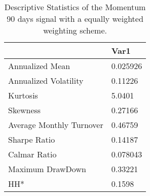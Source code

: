 \begin{table}[H]
\centering
\begin{tabular}{ll}
& Var1 \\ 
\hline 
Annualized Mean & 0.025926 \\ 
Annualized Volatility & 0.11226 \\ 
Kurtosis & 5.0401 \\ 
Skewness & 0.27166 \\ 
Average Monthly Turnover & 0.46759 \\ 
Sharpe Ratio & 0.14187 \\ 
Calmar Ratio & 0.078043 \\ 
Maximum DrawDown & 0.33221 \\ 
HH* & 0.1598 \\ 
\hline
\end{tabular}
\caption{Descriptive Statistics of the Momentum 90 days signal with a equally weighted weighting scheme.}
\label{MOM90EW}
\end{table}